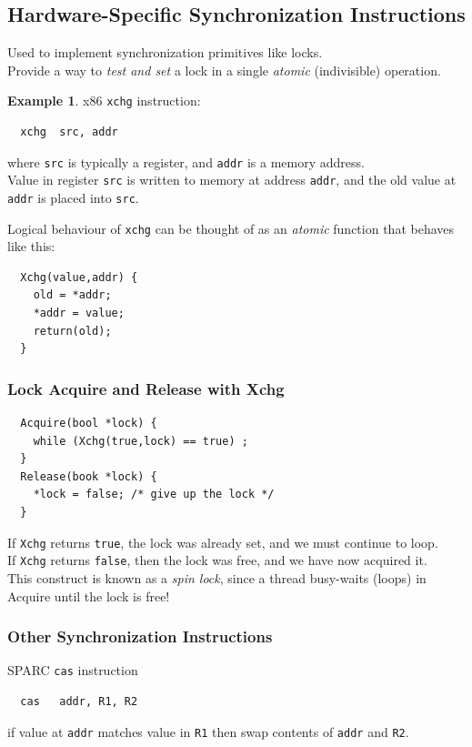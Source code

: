 \documentclass[12pt]{article}
\theoremstyle{plain}
\theoremstyle{definition}
\newtheorem*{ex*}{Example}
\begin{document}
\subsection{Hardware-Specific Synchronization Instructions}
Used to implement synchronization primitives like locks. \\
Provide a way to \emph{test and set} a lock in a single \emph{atomic} (indivisible) operation. \\
\begin{ex*}
x86 \texttt{xchg} instruction:
\begin{verbatim}
  xchg  src, addr
\end{verbatim}
where \texttt{src} is typically a register, and \texttt{addr} is a memory address. \\
Value in register \texttt{src} is written to memory at address \texttt{addr}, and the old value at \texttt{addr} is placed into \texttt{src}.
\end{ex*}
Logical behaviour of \texttt{xchg} can be thought of as an \emph{atomic} function that behaves like this:
\begin{verbatim}
  Xchg(value,addr) {
    old = *addr;
    *addr = value;
    return(old);
  }
\end{verbatim}

\subsubsection{Lock Acquire and Release with Xchg}
\begin{verbatim}
  Acquire(bool *lock) {
    while (Xchg(true,lock) == true) ;
  }
  Release(book *lock) {
    *lock = false; /* give up the lock */
  }
\end{verbatim}
If \texttt{Xchg} returns \texttt{true}, the lock was already set, and we must continue to loop. \\
If \texttt{Xchg} returns \texttt{false}, then the lock was free, and we have now acquired it. \\

This construct is known as a \emph{spin lock}, since a thread busy-waits (loops) in Acquire until the lock is free!

\subsubsection{Other Synchronization Instructions}
SPARC \texttt{cas} instruction
\begin{verbatim}
  cas   addr, R1, R2
\end{verbatim}
if value at \texttt{addr} matches value in \texttt{R1} then swap contents of \texttt{addr} and \texttt{R2}. \\
\end{document}

